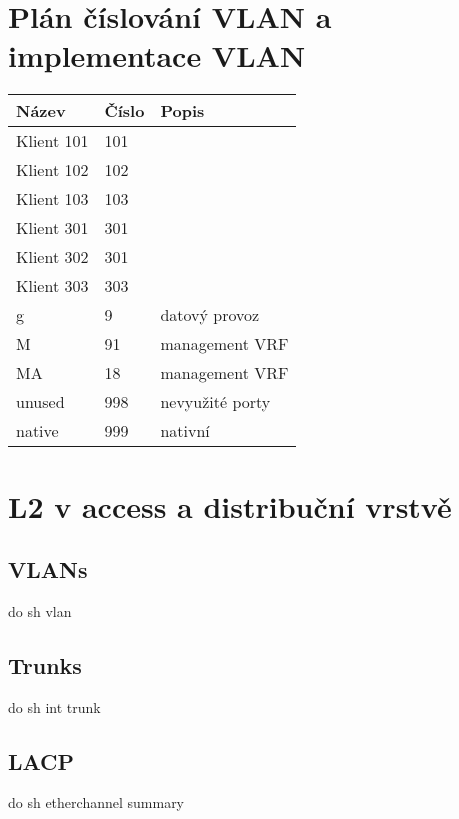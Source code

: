 \documentclass[czech,master,dept460,male,cpp,cpdeclaration]{diploma}
\begin{document}
\MakeTitlePages

\section{Plán číslování VLAN a implementace VLAN}
\label{sec:Sec01}
\begin{tabular}{l|l|l}
	Název & Číslo & Popis \\
	\hline
	Klient 101 & 101 & \\
	Klient 102 & 102 & \\
	Klient 103 & 103 & \\
	Klient 301 & 301 & \\
	Klient 302 & 301 & \\
	Klient 303 & 303 & \\
	g & 9 & datový provoz\\
	M & 91 & management VRF\\
	MA & 18 & management VRF\\
	unused & 998 & nevyužité porty \\
	native & 999 & nativní \\
\end{tabular}

\newpage
\section{L2 v access a distribuční vrstvě}
\label{sec:Sec02}

\subsection{VLANs}
\label{subsec:Sec021}
\noindent do sh vlan

\subsection{Trunks}
\label{subsec:Sec022}
\noindent do sh int trunk

\subsection{LACP}
\label{subsec:Sec023}
\noindent do sh etherchannel summary
\end{document}
